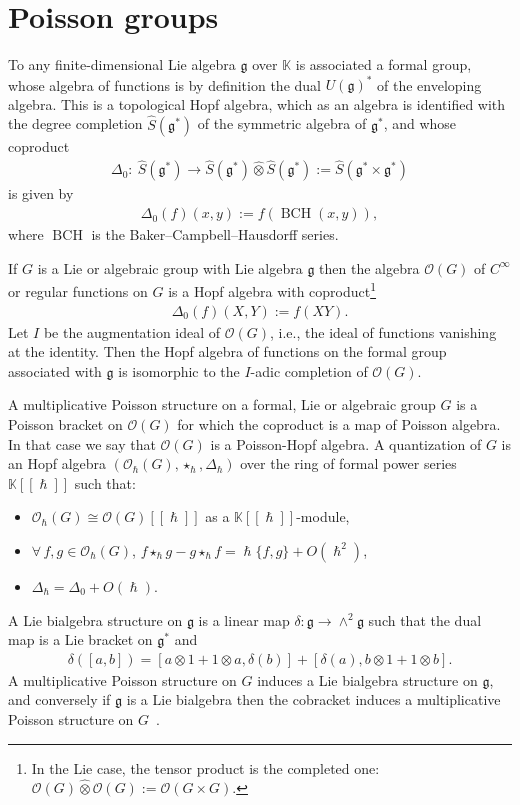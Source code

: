 \documentclass[11pt]{article}
\numberwithin{equation}{section}
\newcommand{\mf}[1]{\mathfrak{#1}}
\newcommand{\h}{\hslash}
\newcommand{\ot}{\otimes}
\newcommand{\cO}{\mathcal O}
\newcommand{\kk}{\mathbb K}
\theoremstyle{definition}
\begin{document}
\section{Poisson groups}
To any f\/inite-dimensional Lie algebra $\mf g$ over $\kk$ is associated a formal group, whose algebra of functions is by def\/inition the dual $U(\mf g)^*$ of the enveloping algebra. This is a topological Hopf algebra, which as an algebra is identif\/ied with the degree completion $\widehat{S}(\mf g^*)$ of the symmetric algebra of $\mf g^*$, and whose coproduct
\begin{gather*}
\Delta_0\colon \ \widehat{S}(\mf g^*)\longrightarrow \widehat{S}(\mf g^*)\hat\ot \widehat{S}(\mf g^*):=\widehat{S}(\mf g^*\times \mf g^*)
\end{gather*}
is given by
\begin{gather*}
	\Delta_0(f)(x,y):=f(\operatorname{BCH}(x,y)),
\end{gather*}
where $\operatorname{BCH}$ is the Baker--Campbell--Hausdorf\/f series.

If $G$ is a Lie or algebraic group with Lie algebra $\mf g$ then the algebra $\cO(G)$ of $C^\infty$ or regular functions on $G$ is a Hopf algebra with coproduct\footnote{In the Lie case, the tensor product is the completed one: $\cO(G)\hat\ot \cO(G):=\cO(G\times G)$.}
\begin{gather*}
	\Delta_0(f)(X,Y):=f(XY).
\end{gather*}
Let $I$ be the augmentation ideal of $\cO(G)$, i.e., the ideal of functions vanishing at the identity. Then the Hopf algebra of functions on the formal group associated with $\mf g$ is isomorphic to the $I$-adic completion of $\cO(G)$.

A multiplicative Poisson structure on a formal, Lie or algebraic group $G$ is a Poisson bracket on $\cO(G)$ for which the coproduct is a map of Poisson algebra. In that case we say that $\cO(G)$ is a Poisson-Hopf algebra.
A quantization of $G$ is an Hopf algebra $(\cO_\h(G),\star_\h,\Delta_\h)$ over the ring of formal power series $\kk[[\h]]$ such that:
\begin{itemize}\itemsep=0pt
	\item $\cO_\h(G)\cong \cO(G)[[\h]]$ as a $\kk[[\h]]$-module,
	\item $\forall\, f, g \in \cO_\h(G)$, $f\star_\h g - g\star_\h f=\h\{f,g\}+O(\h^2)$,
	\item $\Delta_\h=\Delta_0+O(\h)$.
\end{itemize}

A Lie bialgebra structure on $\mf g$ is a linear map $\delta\colon \mf g\rightarrow \wedge^2 \mf g$ such that the dual map is a Lie bracket on $\mf g^*$ and
\begin{gather*}
	\delta([a,b])=[a\ot 1+1\ot a,\delta(b)]+[\delta(a),b\ot 1+1\ot b].
\end{gather*}
A multiplicative Poisson structure on $G$ induces a Lie bialgebra structure on $\mf g$, and conversely if $\mf g$ is a Lie bialgebra then the cobracket induces a multiplicative Poisson structure on $G$~\cite{Drinfeld1987}.
\end{document}
